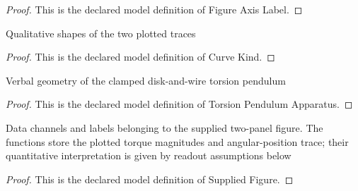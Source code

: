 \begin{proof}
  This is the declared model definition of Figure Axis Label.
\end{proof}
\begin{definition}
  \label{def:physics:phyx-mini-0278:phyxminiproblems-problemphyxmini0278-curvekind}
  Qualitative shapes of the two plotted traces
\end{definition}
\begin{proof}
  This is the declared model definition of Curve Kind.
\end{proof}
\begin{definition}
  \label{def:physics:phyx-mini-0278:phyxminiproblems-problemphyxmini0278-torsionpendulumapparatus}
  Verbal geometry of the clamped disk-and-wire torsion pendulum
\end{definition}
\begin{proof}
  This is the declared model definition of Torsion Pendulum Apparatus.
\end{proof}
\begin{definition}
  \label{def:physics:phyx-mini-0278:phyxminiproblems-problemphyxmini0278-suppliedfigure}
  Data channels and labels belonging to the supplied two-panel figure. The functions store the plotted torque magnitudes and angular-position trace; their quantitative interpretation is given by readout assumptions below
\end{definition}
\begin{proof}
  This is the declared model definition of Supplied Figure.
\end{proof}
